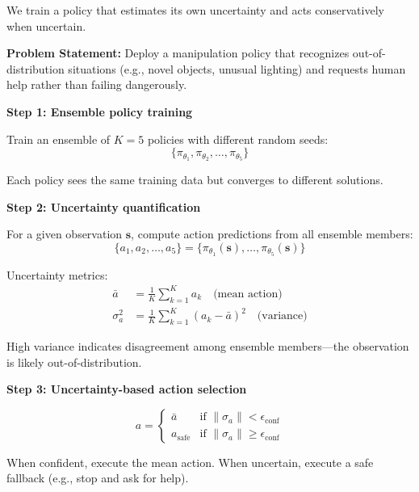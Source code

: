 \begin{example}
\label{ex:uncertainty_aware}
We train a policy that estimates its own uncertainty and acts conservatively when uncertain.

\textbf{Problem Statement:}
Deploy a manipulation policy that recognizes out-of-distribution situations (e.g., novel objects, unusual lighting) and requests human help rather than failing dangerously.

\textbf{Step 1: Ensemble policy training}

Train an ensemble of $K=5$ policies with different random seeds:
\begin{equation}
\{\pi_{\theta_1}, \pi_{\theta_2}, \ldots, \pi_{\theta_5}\}
\end{equation}

Each policy sees the same training data but converges to different solutions.

\textbf{Step 2: Uncertainty quantification}

For a given observation $\mathbf{s}$, compute action predictions from all ensemble members:
\begin{equation}
\{a_1, a_2, \ldots, a_5\} = \{\pi_{\theta_1}(\mathbf{s}), \ldots, \pi_{\theta_5}(\mathbf{s})\}
\end{equation}

Uncertainty metrics:
\begin{align}
\bar{a} &= \frac{1}{K} \sum_{k=1}^{K} a_k \quad \text{(mean action)} \\
\sigma_a^2 &= \frac{1}{K} \sum_{k=1}^{K} (a_k - \bar{a})^2 \quad \text{(variance)}
\end{align}

High variance indicates disagreement among ensemble members---the observation is likely out-of-distribution.

\textbf{Step 3: Uncertainty-based action selection}

\begin{equation}
a = \begin{cases}
\bar{a} & \text{if } \|\sigma_a\| < \epsilon_{\text{conf}} \\
a_{\text{safe}} & \text{if } \|\sigma_a\| \geq \epsilon_{\text{conf}}
\end{cases}
\end{equation}

When confident, execute the mean action. When uncertain, execute a safe fallback (e.g., stop and ask for help).


\end{example}
